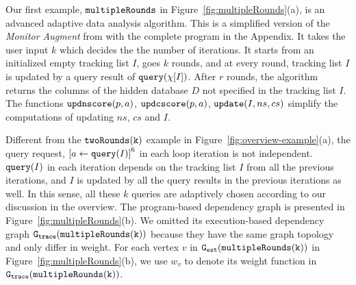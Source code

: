 \begin{example}
    \label{ex:multipleRounds}
    Our first example, $\mathtt{multipleRounds}$ in Figure~\ref{fig:multipleRounds}(a), is an advanced adaptive data analysis algorithm.
    This is a simplified version of the \emph{Monitor Augment} from \cite{RogersRSSTW20} with the complete program in the Appendix.
    It takes the user input $k$ which decides the 
    the number of iterations.
    It starts from an initialized empty tracking list $I$,
    goes $k$ rounds, and at every round, tracking list $I$ is updated by a query result of ${\tt query}(\chi[I])$.
    After $r$ rounds, the algorithm returns the columns of the hidden database $D$ not specified in the tracking list $I$.
    The functions $\mathtt{updnscore}(p,a)$,
    $\mathtt{updcscore}(p,a)$, $\mathtt{update}(I,ns,cs)$ simplify the computations of updating $ns$, $cs$ and $I$.%

    Different from the $\mathtt{twoRounds(k)}$ example in Figure~\ref{fig:overview-example}(a),
    the query request, $\clabel{\assign{a}{\query(I)}}^6$ in each loop iteration is not independent. 
    ${\tt query}(I)$ in each iteration depends on the tracking list $I$ from all the previous iterations, 
    and $I$ is updated by all the query results in the previous iterations as well. 
    In this sense, all these $k$ queries are adaptively chosen according to our discussion in the overview.
    The program-based dependency graph is presented in Figure~\ref{fig:multipleRounds}(b). 
    We omitted its execution-based dependency graph $\mathtt{{G_{trace}}}(\mathtt{multipleRounds(k)})$ because they have the same graph topology and only differ in weight.
    For each vertex $v$ in $\mathtt{{G_{est}}}(\mathtt{multipleRounds(k)})$ in Figure~\ref{fig:multipleRounds}(b),
    we use $w_{v}$ to denote its weight function in $\mathtt{{G_{trace}}}(\mathtt{multipleRounds(k)})$.
    

\end{example}
